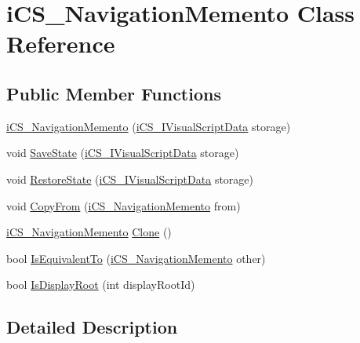 \hypertarget{classi_c_s___navigation_memento}{\section{i\+C\+S\+\_\+\+Navigation\+Memento Class Reference}
\label{classi_c_s___navigation_memento}
}
\subsection*{Public Member Functions}
\begin{DoxyCompactItemize}
\item 
\hyperlink{classi_c_s___navigation_memento_a6260f0a9e33ad6c287f2af4e67ccd6b6}{i\+C\+S\+\_\+\+Navigation\+Memento} (\hyperlink{interfacei_c_s___i_visual_script_data}{i\+C\+S\+\_\+\+I\+Visual\+Script\+Data} storage)
\item 
void \hyperlink{classi_c_s___navigation_memento_a45d0607ba4049963450c74a84649e80f}{Save\+State} (\hyperlink{interfacei_c_s___i_visual_script_data}{i\+C\+S\+\_\+\+I\+Visual\+Script\+Data} storage)
\item 
void \hyperlink{classi_c_s___navigation_memento_a3d4539b90c81e83452332db906b095fe}{Restore\+State} (\hyperlink{interfacei_c_s___i_visual_script_data}{i\+C\+S\+\_\+\+I\+Visual\+Script\+Data} storage)
\item 
void \hyperlink{classi_c_s___navigation_memento_a5cdb04f9dfa79d8ef9db17f49388a86d}{Copy\+From} (\hyperlink{classi_c_s___navigation_memento}{i\+C\+S\+\_\+\+Navigation\+Memento} from)
\item 
\hyperlink{classi_c_s___navigation_memento}{i\+C\+S\+\_\+\+Navigation\+Memento} \hyperlink{classi_c_s___navigation_memento_ac203b25c81c4c3a5b55195421421eca3}{Clone} ()
\item 
bool \hyperlink{classi_c_s___navigation_memento_a3127011efb92596693854f8515534364}{Is\+Equivalent\+To} (\hyperlink{classi_c_s___navigation_memento}{i\+C\+S\+\_\+\+Navigation\+Memento} other)
\item 
bool \hyperlink{classi_c_s___navigation_memento_a41d2d96570d874c6b707d500dc70bc68}{Is\+Display\+Root} (int display\+Root\+Id)
\end{DoxyCompactItemize}


\subsection{Detailed Description}


